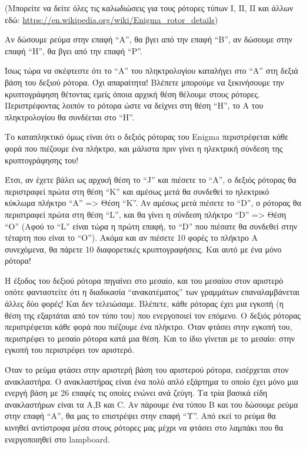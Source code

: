 \documentclass[a4paper,twoside,12pt]{article}
\begin{document}
(Μπορείτε να δείτε όλες τις καλωδιώσεις για τους ρότορες τύπων Ι, ΙΙ, ΙΙ και άλλων εδώ: \url{https://en.wikipedia.org/wiki/Enigma_rotor_details})

Αν δώσουμε ρεύμα στην επαφή “Α”, θα βγει από την επαφή “Β”, αν δώσουμε στην επαφή “Η”, θα βγει από την επαφή “P”.

Ίσως τώρα να σκέφτεστε ότι το “Α” του πληκτρολογίου καταλήγει στο “Α” στη δεξιά βάση του δεξιού ρότορα. Όχι απαραίτητα! Βλέπετε μπορούμε να ξεκινήσουμε την κρυπτογράφηση θέτοντας εμείς όποια αρχική θέση θέλουμε στους ρότορες. Περιστρέφοντας λοιπόν το ρότορα ώστε να δείχνει στη θέση “Η”, το Α του πληκτρολογίου θα συνδέεται στο “Η”. 

Το καταπληκτικό όμως είναι ότι ο δεξιός ρότορας του Enigma περιστρέφεται κάθε φορά που πιέζουμε ένα πλήκτρο, και μάλιστα πριν γίνει η ηλεκτρική σύνδεση της κρυπτογράφησης του!

Έτσι, αν έχετε βάλει ως αρχική θέση το “J” και πιέσετε το “Α”, ο δεξιός ρότορας θα περιστραφεί πρώτα στη θέση “K” και αμέσως μετά θα συνδεθεί το ηλεκτρικό κύκλωμα πλήκτρο “Α” => Θέση “Κ”. Αν αμέσως μετά πιέσετε το “D”, ο ρότορας θα περιστραφεί πρώτα στη θέση “L”, και θα γίνει η σύνδεση πλήκτρο “D” => Θέση “O” (Αφού το “L” είναι τώρα η πρώτη επαφή, το “D” που πιέσατε θα συνδεθεί στην τέταρτη που είναι το “Ο”). Ακόμα και αν πιέσετε 10 φορές το πλήκτρο Α συνεχόμενα, θα πάρετε 10 διαφορετικές κρυπτογραφήσεις. Και αυτό με ένα μόνο ρότορα!

Η έξοδος του δεξιού ρότορα πηγαίνει στο μεσαίο, και του μεσαίου στον αριστερό οπότε φανταστείτε ότι η διαδικασία “ανακατέματος” των γραμμάτων επαναλαμβάνεται άλλες δύο φορές! Και δεν τελειώσαμε. Βλέπετε, κάθε ρότορας έχει μια εγκοπή (η θέση της εξαρτάται από τον τύπο του) που ενεργοποιεί τον επόμενο. Ο δεξιός ρότορας περιστρέφεται κάθε φορά που πιέζουμε ένα πλήκτρο. Όταν φτάσει στην εγκοπή του, περιστρέφει το μεσαίο ρότορα κατά μια θέση. Και το ίδιο γίνεται με το μεσαίο: στην εγκοπή του περιστρέφει τον αριστερό.

Όταν το ρεύμα φτάσει στην αριστερή βάση του αριστερού ρότορα, εισέρχεται στον ανακλαστήρα. Ο ανακλαστήρας είναι ένα πολύ απλό εξάρτημα το οποίο έχει μόνο μια ενεργή βάση με 26 επαφές τις οποίες ενώνει ανά ζεύγη. Τα τρία βασικά είδη ανακλαστήρων είναι τα Α,B και C. Αν πάρουμε ένα τύπου Β και του δώσουμε ρεύμα στην επαφή “Α”, θα μας το επιστρέψει στην επαφή “Υ”. Από εκεί το ρεύμα θα κινηθεί αντίστροφα μέσα στους ρότορες μας μέχρι να φτάσει στο λαμπάκι που θα ενεργοποιηθεί στο lampboard. 
\end{document}
